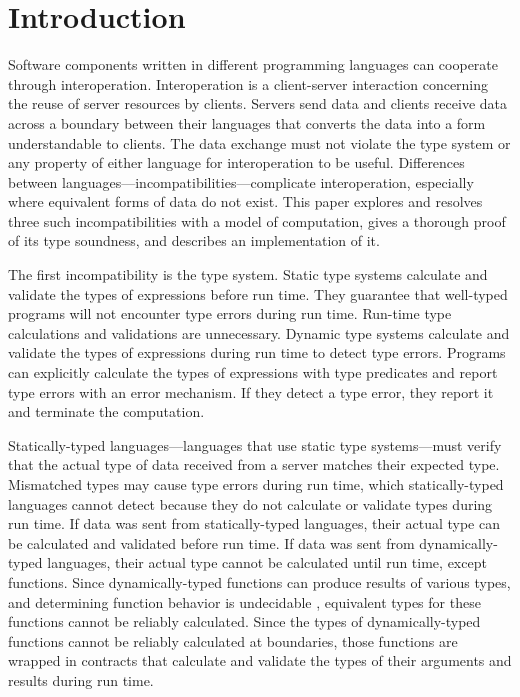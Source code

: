 \chapter{Introduction}

Software components written in different programming languages can cooperate through interoperation.  Interoperation is a client-server interaction concerning the reuse of server resources by clients.  Servers send data and clients receive data across a boundary between their languages that converts the data into a form understandable to clients.  The data exchange must not violate the type system or any property of either language for interoperation to be useful.  Differences between languages---incompatibilities---complicate interoperation, especially where equivalent forms of data do not exist.  This paper explores and resolves three such incompatibilities with a model of computation, gives a thorough proof of its type soundness, and describes an implementation of it.

The first incompatibility is the type system.  Static type systems calculate and validate the types of expressions before run time.  They guarantee that well-typed programs will not encounter type errors during run time.  Run-time type calculations and validations are unnecessary.  Dynamic type systems calculate and validate the types of expressions during run time to detect type errors.  Programs can explicitly calculate the types of expressions with type predicates and report type errors with an error mechanism.  If they detect a type error, they report it and terminate the computation.

Statically-typed languages---languages that use static type systems---must verify that the actual type of data received from a server matches their expected type.  Mismatched types may cause type errors during run time, which statically-typed languages cannot detect because they do not calculate or validate types during run time.  If data was sent from statically-typed languages, their actual type can be calculated and validated before run time.  If data was sent from dynamically-typed languages, their actual type cannot be calculated until run time, except functions.  Since dynamically-typed functions can produce results of various types, and determining function behavior is undecidable \cite{blume04}, equivalent types for these functions cannot be reliably calculated.  Since the types of dynamically-typed functions cannot be reliably calculated at boundaries, those functions are wrapped in contracts \cite{findler02} that calculate and validate the types of their arguments and results during run time.

